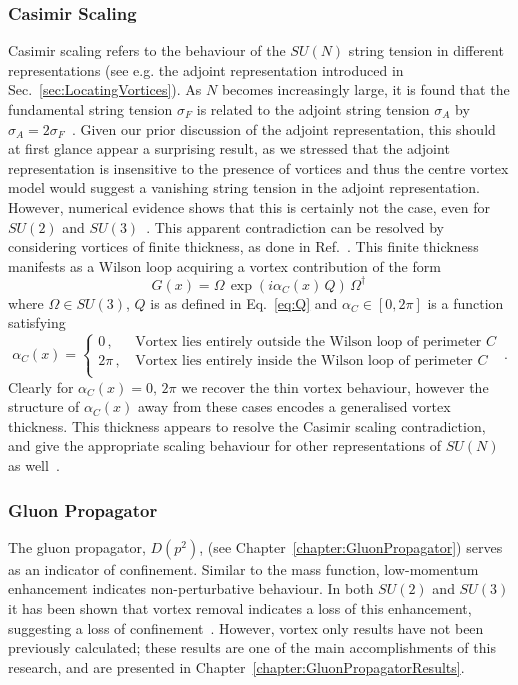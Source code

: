 \subsubsection{Casimir Scaling}
Casimir scaling refers to the behaviour of the $SU(N)$ string tension in different representations (see e.g. the adjoint representation introduced in Sec.~\ref{sec:LocatingVortices}). As $N$ becomes increasingly large, it is found that the fundamental string tension $\sigma_F$ is related to the adjoint string tension $\sigma_A$ by $\sigma_A = 2\sigma_F$~\cite{Greensite:1982be}. Given our prior discussion of the adjoint representation, this should at first glance appear a surprising result, as we stressed that the adjoint representation is insensitive to the presence of vortices and thus the centre vortex model would suggest a vanishing string tension in the adjoint representation. However, numerical evidence shows that this is certainly not the case, even for $SU(2)$ and $SU(3)$~\cite{Ambjorn:1984mb,Ambjorn:1984dp,Campbell:1985kp}. This apparent contradiction can be resolved by considering vortices of finite thickness, as done in Ref.~\cite{Faber:1997rp}. This finite thickness manifests as a Wilson loop acquiring a vortex contribution of the form
%
\begin{equation}
G(x) = \Omega\,\exp\left(i \alpha_C(x)\,Q\right)\, \Omega^\dagger\,
\end{equation}
%
where $\Omega\in SU(3)$, $Q$ is as defined in Eq.~\ref{eq:Q} and $\alpha_C\in [0,2\pi]$ is a function satisfying
%
\begin{equation}
\alpha_C(x)=
\begin{cases}
0\, , &\, \text{Vortex lies entirely outside the Wilson loop of perimeter $C$}\\
2\pi\, , &\, \text{Vortex lies entirely inside the Wilson loop of perimeter $C$}\\
\end{cases}\, .
\end{equation}
%
Clearly for $\alpha_C(x) = 0,\,2\pi$ we recover the thin vortex behaviour, however the structure of $\alpha_C(x)$ away from these cases encodes a generalised vortex thickness. This thickness appears to resolve the Casimir scaling contradiction, and give the appropriate scaling behaviour for other representations of $SU(N)$ as well~\cite{Faber:1997rp}.
\subsubsection{Gluon Propagator}
The gluon propagator, $D(p^2)$, (see Chapter~\ref{chapter:GluonPropagator}) serves as an indicator of confinement. Similar to the mass function, low-momentum enhancement indicates non-perturbative behaviour. In both $SU(2)$ and $SU(3)$ it has been shown that vortex removal indicates a loss of this enhancement, suggesting a loss of confinement~\cite{Bowman:2010zr,Langfeld:2001cz,Quandt:2010yq}. However, vortex only results have not been previously calculated; these results are one of the main accomplishments of this research, and are presented in Chapter~\ref{chapter:GluonPropagatorResults}.

